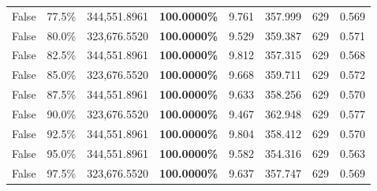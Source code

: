 \begin{table}[H]
\begin{tabular}{|m{}| m{}| r | R{0.13\textwidth}| R{0.09\textwidth}| R{0.09\textwidth}| R{0.09\textwidth}| R{0.11\textwidth} |}
False & 77.5\% & 344,551.8961 & \bfseries \color{red} 100.0000\% & 9.761 & 357.999 & 629 & 0.569 \\
False & 80.0\% & 323,676.5520 & \bfseries \color{red} 100.0000\% & 9.529 & 359.387 & 629 & 0.571 \\
False & 82.5\% & 344,551.8961 & \bfseries \color{red} 100.0000\% & 9.812 & 357.315 & 629 & 0.568 \\
False & 85.0\% & 323,676.5520 & \bfseries \color{red} 100.0000\% & 9.668 & 359.711 & 629 & 0.572 \\
False & 87.5\% & 344,551.8961 & \bfseries \color{red} 100.0000\% & 9.633 & 358.256 & 629 & 0.570 \\
False & 90.0\% & 323,676.5520 & \bfseries \color{red} 100.0000\% & 9.467 & 362.948 & 629 & 0.577 \\
False & 92.5\% & 344,551.8961 & \bfseries \color{red} 100.0000\% & 9.804 & 358.412 & 629 & 0.570 \\
False & 95.0\% & 344,551.8961 & \bfseries \color{red} 100.0000\% & 9.582 & 354.316 & 629 & 0.563 \\
False & 97.5\% & 323,676.5520 & \bfseries \color{red} 100.0000\% & 9.637 & 357.747 & 629 & 0.569 \\
\bottomrule
\end{tabular}
\end{table}
